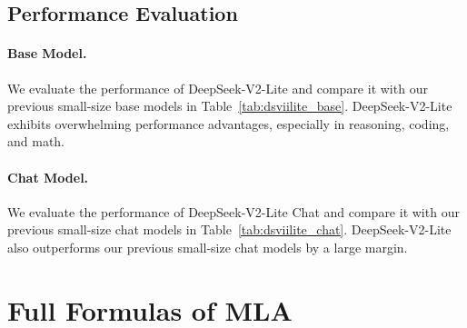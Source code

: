 \documentclass[11pt, a4paper, logo, copyright, nonumbering]{deepseek}
\newcommand{\dsviilite}{DeepSeek-V2-Lite}
\newcommand{\dsattn}{MLA}
\begin{document}
\begin{CJK*}{UTF8}{gbsn}
\subsection{Performance Evaluation}

\paragraph{Base Model.}
We evaluate the performance of \dsviilite{} and compare it with our previous small-size base models in Table~\ref{tab:dsviilite_base}. 
\dsviilite{} exhibits overwhelming performance advantages, especially in reasoning, coding, and math. 

\paragraph{Chat Model.}
We evaluate the performance of \dsviilite{} Chat and compare it with our previous small-size chat models in Table~\ref{tab:dsviilite_chat}. 
\dsviilite{} also outperforms our previous small-size chat models by a large margin. 

\section{Full Formulas of \dsattn{}}
\label{app:full_formulas}


\end{CJK*}
\end{document}
